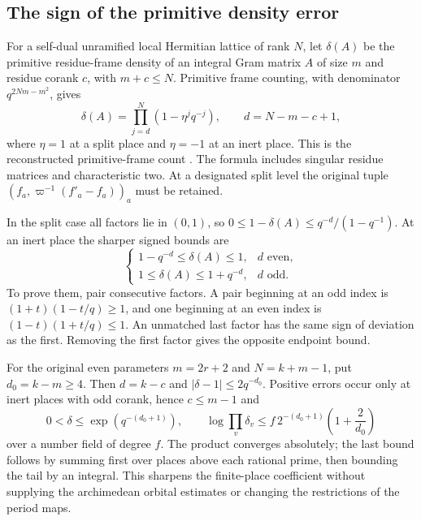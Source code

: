 \subsection{The sign of the primitive density error}
\label{sec:primitive-local-density}

For a self-dual unramified local Hermitian lattice of rank $N$, let
$\delta(A)$ be the primitive residue-frame density of an integral Gram
matrix $A$ of size $m$ and residue corank $c$, with $m+c\le N$.
Primitive frame counting, with denominator $q^{2Nm-m^2}$, gives
\begin{equation}
 \delta(A)=\prod_{j=d}^{N}(1-\eta^j q^{-j}),
 \qquad d=N-m-c+1,
 \label{eq:primitive-density-product}
\end{equation}
where $\eta=1$ at a split place and $\eta=-1$ at an inert place.
This is the reconstructed primitive-frame count \cite{reconstruction}.
The formula includes singular residue matrices and characteristic two.
At a designated split level the original tuple
$(f_a,\varpi^{-1}(f'_a-f_a))_a$ must be retained.

In the split case all factors lie in $(0,1)$, so
$0\le1-\delta(A)\le q^{-d}/(1-q^{-1})$.
At an inert place the sharper signed bounds are
\[
 \begin{cases}
  1-q^{-d}\le\delta(A)\le1,&d\text{ even},\\
  1\le\delta(A)\le1+q^{-d},&d\text{ odd}.
 \end{cases}
\]
To prove them, pair consecutive factors. A pair beginning at an odd
index is $(1+t)(1-t/q)\ge1$, and one beginning at an even index is
$(1-t)(1+t/q)\le1$. An unmatched last factor has the same sign of
deviation as the first. Removing the first factor gives the opposite
endpoint bound.

For the original even parameters $m=2r+2$ and $N=k+m-1$, put
$d_0=k-m\ge4$. Then $d=k-c$ and
$|\delta-1|\le2q^{-d_0}$. Positive errors occur only at inert places
with odd corank, hence $c\le m-1$ and
\[
 0<\delta\le\exp(q^{-(d_0+1)}),\qquad
 \log\prod_v\delta_v
 \le f\,2^{-(d_0+1)}\left(1+\frac2{d_0}\right)
\]
over a number field of degree $f$. The product converges absolutely;
the last bound follows by summing first over places above each rational
prime, then bounding the tail by an integral. This sharpens the
finite-place coefficient without supplying the archimedean orbital
estimates or changing the restrictions of the period maps.
